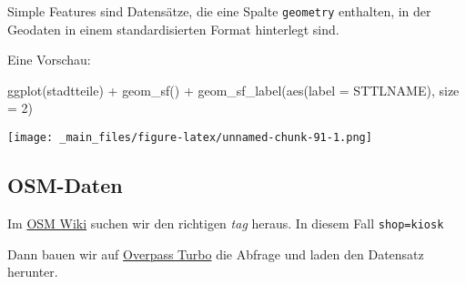 \documentclass[11pt,german,a4paper]{article}
\newenvironment{Shaded}{\begin{snugshade}}{\end{snugshade}}
\newcommand{\AttributeTok}[1]{\textcolor[rgb]{0.77,0.63,0.00}{#1}}
\newcommand{\DecValTok}[1]{\textcolor[rgb]{0.00,0.00,0.81}{#1}}
\newcommand{\DocumentationTok}[1]{\textcolor[rgb]{0.56,0.35,0.01}{\textbf{\textit{#1}}}}
\newcommand{\FunctionTok}[1]{\textcolor[rgb]{0.00,0.00,0.00}{#1}}
\newcommand{\NormalTok}[1]{#1}
\newcommand{\SpecialCharTok}[1]{\textcolor[rgb]{0.00,0.00,0.00}{#1}}
\begin{document}
Simple Features sind Datensätze, die eine Spalte \texttt{geometry} enthalten, in der Geodaten in einem standardisierten Format hinterlegt sind.

\begin{Shaded}
\end{Shaded}

Eine Vorschau:

\begin{Shaded}
\begin{Highlighting}[]
\FunctionTok{ggplot}\NormalTok{(stadtteile) }\SpecialCharTok{+}
  \FunctionTok{geom\_sf}\NormalTok{() }\SpecialCharTok{+}
  \FunctionTok{geom\_sf\_label}\NormalTok{(}\FunctionTok{aes}\NormalTok{(}\AttributeTok{label =}\NormalTok{ STTLNAME), }\AttributeTok{size =} \DecValTok{2}\NormalTok{)}
\end{Highlighting}
\end{Shaded}

\texttt{[image: \_main\_files/figure-latex/unnamed-chunk-91-1.png]}

\hypertarget{osm-daten}{%
\subsection{OSM-Daten}\label{osm-daten}}

Im \href{https://wiki.openstreetmap.org/wiki/Map_Features}{OSM Wiki} suchen wir den richtigen \emph{tag} heraus. In diesem Fall \texttt{shop=kiosk}

Dann bauen wir auf \href{https://overpass-turbo.eu/}{Overpass Turbo} die Abfrage und laden den Datensatz herunter.
\end{document}
